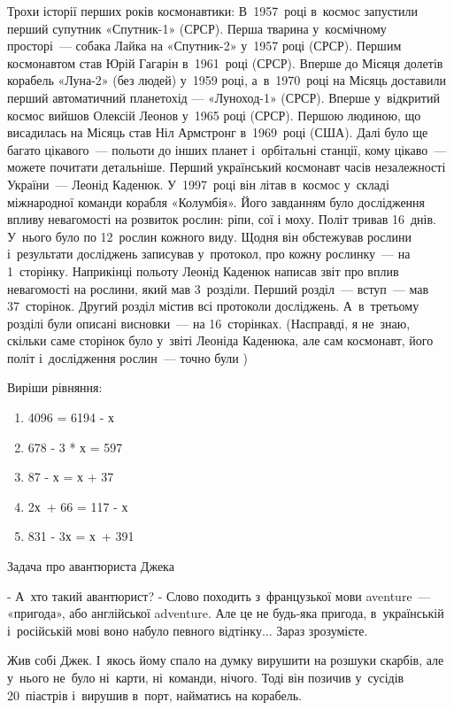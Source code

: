 Трохи історії перших років космонавтики:
В~1957~році в~космос запустили перший супутник «Спутник-1» (СРСР).
Перша тварина у~космічному просторі~--- собака Лайка на «Спутник-2»
у~1957 році (СРСР).
Першим космонавтом став Юрій Гагарін в~1961~році (СРСР).
Вперше до Місяця долетів корабель «Луна-2» (без людей) у~1959 році,
а~в~1970~році на Місяць доставили перший автоматичний планетохід —
«Луноход-1» (СРСР).
Вперше у~відкритий космос вийшов Олексій Леонов у~1965 році (СРСР).
Першою людиною, що висадилась на Місяць став Ніл Армстронг в~1969~році (США).
Далі було ще багато цікавого~--- польоти до інших планет і~орбітальні станції,
кому цікаво~--- можете почитати детальніше.
Перший український космонавт часів незалежності України~--- Леонід Каденюк.
У~1997~році він літав в~космос у~складі міжнародної команди корабля «Колумбія».
Його завданням було дослідження впливу невагомості на розвиток рослин:
ріпи, сої і моху. Політ тривав 16~днів. У~нього було по 12~рослин кожного виду.
Щодня він обстежував рослини і~результати досліджень записував у~протокол,
про кожну рослинку~--- на 1~сторінку. Наприкінці польоту Леонід Каденюк
написав звіт про вплив невагомості на рослини, який мав 3~розділи.
Перший розділ~--- вступ~--- мав 37~сторінок. Другий розділ містив всі
протоколи досліджень. А~в~третьому розділі були описані висновки~---
на 16~сторінках.
(Насправді, я не~знаю, скільки саме сторінок було у~звіті Леоніда Каденюка,
але сам космонавт, його політ і~дослідження рослин~--- точно були \smiley)


\problem
Виріши рівняння:
\begin{multicols}{2}
    \begin{enumerate}
        \item 4096 = 6194 - х
        \item 678 - 3 * х = 597
        \item 87 - х = х + 37
        \item 2х + 66 = 117 - х
        \item 831 - 3х = х + 391
    \end{enumerate}
\end{multicols}


\problem
Задача про авантюриста Джека

- А~хто такий авантюрист?
- Слово походить з~французької мови aventure~--- «пригода»,
або англійської adventure. Але це не будь-яка пригода,
в~українській і~російській мові воно набуло певного відтінку...
Зараз зрозумієте.

Жив собі Джек. І~якось йому спало на думку вирушити на розшуки скарбів,
але у~нього не~було ні~карти, ні~команди, нічого. Тоді він позичив
у~сусідів 20~піастрів і~вирушив в~порт, найматись на корабель.

